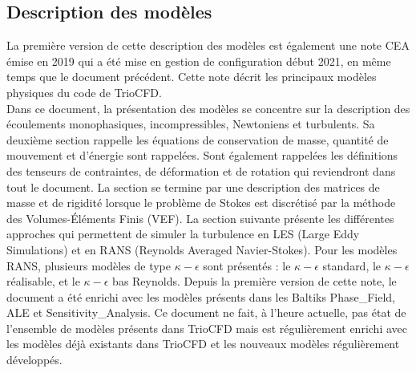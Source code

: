 \subsection{\label{subsec:modeles}Description des mod\`eles}
La première version de cette description des modèles est également une note CEA émise en 2019 qui a été mise en gestion de configuration début 2021, en même temps que le document précédent. Cette note décrit les principaux modèles physiques du code de TrioCFD.\\
Dans ce document, la présentation des modèles se concentre
sur la description des écoulements monophasiques, incompressibles, Newtoniens et turbulents. Sa deuxième section rappelle les équations de conservation de masse, quantité de mouvement et d'énergie sont rappelées. Sont également rappelées les définitions des tenseurs de contraintes, de déformation et de rotation qui reviendront dans tout le document. La section se termine par une description des matrices
de masse et de rigidité lorsque le problème de Stokes est discrétisé par la méthode des Volumes-Éléments Finis (VEF). La section suivante présente les différentes approches qui permettent de simuler la
turbulence en LES (Large Eddy Simulations) et en RANS (Reynolds Averaged Navier-Stokes). Pour les modèles RANS, plusieurs modèles de type $\kappa-\epsilon$ sont présentés : le $\kappa-\epsilon$ standard, le $\kappa-\epsilon$ réalisable, et le $\kappa-\epsilon$ bas Reynolds.  Depuis la première version de cette note, le document a été enrichi avec les modèles présents dans les Baltiks Phase\_Field, ALE et Sensitivity\_Analysis. Ce document ne fait, à l'heure actuelle, pas état de l'ensemble de modèles présents dans TrioCFD mais est régulièrement enrichi avec les modèles déjà existants dans TrioCFD et les nouveaux modèles régulièrement développés.
